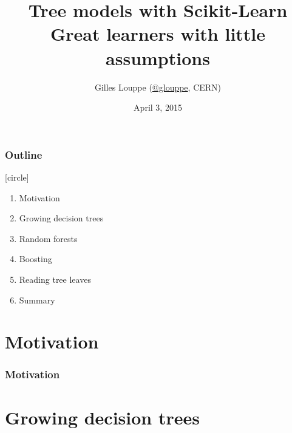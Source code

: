 \documentclass{beamer}
\title{{\bf Tree models with Scikit-Learn}\\
Great learners with little assumptions}
\author{Gilles Louppe (\href{https://twitter.com/glouppe}{@glouppe}, CERN)}
\date{April 3, 2015}
\begin{document}
\begin{frame}
\titlepage
\end{frame}



\begin{frame}
  \frametitle{Outline}
  [circle]
  \begin{enumerate}
  \item Motivation

  \vspace{0.5cm}

  \item Growing decision trees

  \vspace{0.5cm}

  \item Random forests

    \vspace{0.5cm}

  \item Boosting

  \vspace{0.5cm}

  \item Reading tree leaves

  \vspace{0.5cm}

  \item Summary
  \end{enumerate}
\end{frame}



\section{Motivation}

\begin{frame}
  \frametitle{Motivation}
\end{frame}




\section{Growing decision trees}
\end{document}

